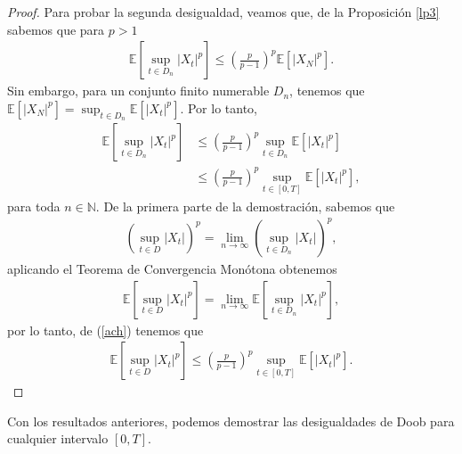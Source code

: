 \begin{proof}
    Para probar la segunda desigualdad, veamos que, de la Proposición \ref{lp3} sabemos que para $p > 1$
    \begin{align*}
		\mathbb{E} \left[ \sup_{t \in D_n} |X_t|^p \right] \leq \left( \frac{p}{p-1} \right)^p \mathbb{E} [|X_N|^p].
	\end{align*}
Sin embargo, para un conjunto finito numerable $D_n$, tenemos que $\mathbb{E} [|X_N|^p] = \sup_{t \in D_n} \mathbb{E}[|X_t|^p]$. Por lo tanto,
	\begin{align}
	\mathbb{E} \left[ \sup_{t \in D_n} |X_t|^p \right] & \leq \left( \frac{p}{p-1} \right)^p \sup_{t \in D_n} \mathbb{E}[|X_t|^p] \nonumber \\
    & \leq \left( \frac{p}{p-1} \right)^p \sup_{t \in [0, T]} \mathbb{E}[|X_t|^p], \label{ach}
	\end{align}
para toda $n \in \mathbb{N}$. De la primera parte de la demostración, sabemos que
	\begin{align*}
		\left( \sup_{t \in D} |X_t| \right)^p = \lim_{n \rightarrow \infty} \left( \sup_{t \in D_n} |X_t| \right)^p,
	\end{align*}
aplicando el Teorema de Convergencia Monótona obtenemos
	\begin{align*}
		\mathbb{E} \left[ \sup_{t \in D} |X_t|^p \right] = \lim_{n \rightarrow \infty} \mathbb{E} \left[ \sup_{t \in D_n} |X_t|^p \right],
	\end{align*}
por lo tanto, de (\ref{ach}) tenemos que
	\begin{align*}
		\mathbb{E} \left[ \sup_{t \in D} |X_t|^p \right] \leq \left( \frac{p}{p-1} \right)^p \sup_{t \in [0, T]} \mathbb{E}[|X_t|^p].
	\end{align*}
\end{proof}

Con los resultados anteriores, podemos demostrar las desigualdades de Doob para cualquier intervalo $[0, T]$.

